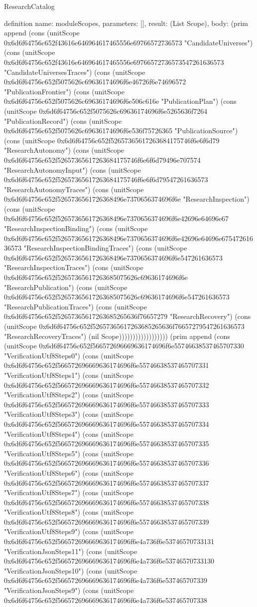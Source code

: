 \begin{lexlean}{ResearchCatalog}
\begin{semanticmodule}
definition{
  name: moduleScopes,
  parameters: [],
  result: (List Scope),
  body: (prim append (cons (unitScope 0x6d6f64756c652f43616e646964617465556e69766572736573 "CandidateUniverses") (cons (unitScope 0x6d6f64756c652f43616e646964617465556e69766572736573547261636573 "CandidateUniversesTraces") (cons (unitScope 0x6d6f64756c652f5075626c69636174696f6e46726f6e74696572 "PublicationFrontier") (cons (unitScope 0x6d6f64756c652f5075626c69636174696f6e506c616e "PublicationPlan") (cons (unitScope 0x6d6f64756c652f5075626c69636174696f6e5265636f7264 "PublicationRecord") (cons (unitScope 0x6d6f64756c652f5075626c69636174696f6e536f75726365 "PublicationSource") (cons (unitScope 0x6d6f64756c652f52657365617263684175746f6e6f6d79 "ResearchAutonomy") (cons (unitScope 0x6d6f64756c652f52657365617263684175746f6e6f6d79496e707574 "ResearchAutonomyInput") (cons (unitScope 0x6d6f64756c652f52657365617263684175746f6e6f6d79547261636573 "ResearchAutonomyTraces") (cons (unitScope 0x6d6f64756c652f5265736561726368496e7370656374696f6e "ResearchInspection") (cons (unitScope 0x6d6f64756c652f5265736561726368496e7370656374696f6e42696e64696e67 "ResearchInspectionBinding") (cons (unitScope 0x6d6f64756c652f5265736561726368496e7370656374696f6e42696e64696e67547261636573 "ResearchInspectionBindingTraces") (cons (unitScope 0x6d6f64756c652f5265736561726368496e7370656374696f6e547261636573 "ResearchInspectionTraces") (cons (unitScope 0x6d6f64756c652f52657365617263685075626c69636174696f6e "ResearchPublication") (cons (unitScope 0x6d6f64756c652f52657365617263685075626c69636174696f6e547261636573 "ResearchPublicationTraces") (cons (unitScope 0x6d6f64756c652f52657365617263685265636f76657279 "ResearchRecovery") (cons (unitScope 0x6d6f64756c652f52657365617263685265636f76657279547261636573 "ResearchRecoveryTraces") (nil Scope)))))))))))))))))) (prim append (cons (unitScope 0x6d6f64756c652f566572696669636174696f6e55746638537465707330 "VerificationUtf8Steps0") (cons (unitScope 0x6d6f64756c652f566572696669636174696f6e55746638537465707331 "VerificationUtf8Steps1") (cons (unitScope 0x6d6f64756c652f566572696669636174696f6e55746638537465707332 "VerificationUtf8Steps2") (cons (unitScope 0x6d6f64756c652f566572696669636174696f6e55746638537465707333 "VerificationUtf8Steps3") (cons (unitScope 0x6d6f64756c652f566572696669636174696f6e55746638537465707334 "VerificationUtf8Steps4") (cons (unitScope 0x6d6f64756c652f566572696669636174696f6e55746638537465707335 "VerificationUtf8Steps5") (cons (unitScope 0x6d6f64756c652f566572696669636174696f6e55746638537465707336 "VerificationUtf8Steps6") (cons (unitScope 0x6d6f64756c652f566572696669636174696f6e55746638537465707337 "VerificationUtf8Steps7") (cons (unitScope 0x6d6f64756c652f566572696669636174696f6e55746638537465707338 "VerificationUtf8Steps8") (cons (unitScope 0x6d6f64756c652f566572696669636174696f6e55746638537465707339 "VerificationUtf8Steps9") (cons (unitScope 0x6d6f64756c652f566572696669636174696f6e4a736f6e53746570733131 "VerificationJsonSteps11") (cons (unitScope 0x6d6f64756c652f566572696669636174696f6e4a736f6e53746570733130 "VerificationJsonSteps10") (cons (unitScope 0x6d6f64756c652f566572696669636174696f6e4a736f6e537465707339 "VerificationJsonSteps9") (cons (unitScope 0x6d6f64756c652f566572696669636174696f6e4a736f6e537465707338 }
\end{semanticmodule}
\end{lexlean}
